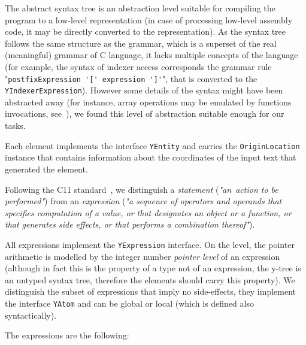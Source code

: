 The abstract syntax tree \ytree{} is an abstraction level suitable for compiling the program to a low-level representation (in case of processing low-level assembly code, it may be directly converted to the \xgraph{} representation).
As the  syntax tree follows the same structure as the grammar, which is a superset of the real (meaningful) grammar of C language, it lacks multiple concepts of the language (for example, the syntax of indexer access corresponds the grammar rule "\lstinline{postfixExpression '[' expression ']'}", that is converted to the \texttt{YIndexerExpression}).
However some details of the syntax might have been abstracted away (for instance, array operations may be emulated by functions invocations, see~\cite[Chapter 5]{gries2012science}), we found this level of abstraction suitable enough for our tasks.

Each \ytree{} element implements the interface \texttt{YEntity} and carries the \texttt{OriginLocation} %
instance that contains information about the coordinates of the input text that generated the \ytree{} element.

Following the C11 standard~\cite{iso2012iec}, we distinguish a \textit{statement} (\textit{"an~action to be performed"}) from an \textit{expression} (\textit{"a sequence of operators and operands that specifies computation of a value, or that designates an object or a function, or that generates side effects, or that performs a combination thereof"}).

All \ytree{} expressions implement the \texttt{YExpression} interface.
On the \ytree{} level, the pointer arithmetic is modelled by the integer number \textit{pointer level} of an expression (although in fact this is the property of a type not of an expression, the y-tree is an untyped syntax tree, therefore the elements \ytree{} should carry this property).
We distinguish the subset of expressions that imply no side-effects, they implement the interface \texttt{YAtom} and can be global or local (which is defined also syntactically).

\vspace{1em}
The \ytree{} expressions are the following:

